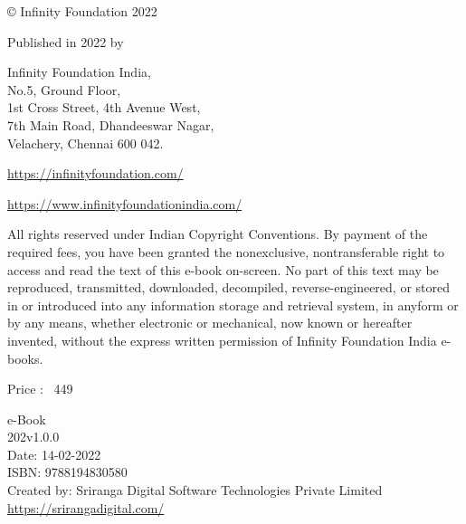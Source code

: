 \thispagestyle{empty}

© Infinity Foundation 2022

Published in 2022 by

Infinity Foundation India,\\ No.5, Ground Floor,\\ 1st Cross Street, 4th Avenue West,\\ 7th Main Road, Dhandeeswar Nagar,\\ Velachery, Chennai 600 042.

\url{https://infinityfoundation.com/}

\url{https://www.infinityfoundationindia.com/}

\bigskip


All rights reserved under Indian Copyright Conventions. By payment of the required fees, you have been granted the nonexclusive, nontransferable right to access and read the text of this e-book on-screen. No part of this text may be reproduced, transmitted, downloaded, decompiled, reverse-engineered, or stored in or introduced into any information storage and retrieval system, in anyform or by any means, whether electronic or mechanical, now known or hereafter invented, without the express written permission of Infinity Foundation India e-books.

\bigskip

Price : {\rupee~449}

\bigskip

e-Book\\
202v1.0.0\\
Date: 14-02-2022\\
ISBN: 9788194830580\\
Created by: Sriranga Digital Software Technologies Private Limited
\url{https://srirangadigital.com/}









